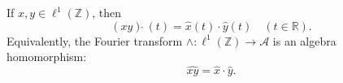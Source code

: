 If $x, y \in \ell^1(\mathbb{Z})$, then
$$(xy)\hat{\;}(t) = \hat{x}(t) \cdot \hat{y}(t) \quad (t \in \mathbb{R}).$$
Equivalently, the Fourier transform $\wedge: \ell^1(\mathbb{Z}) \to \mathcal{A}$ is an algebra homomorphism:
$$\widehat{xy} = \hat{x} \cdot \hat{y}.$$
